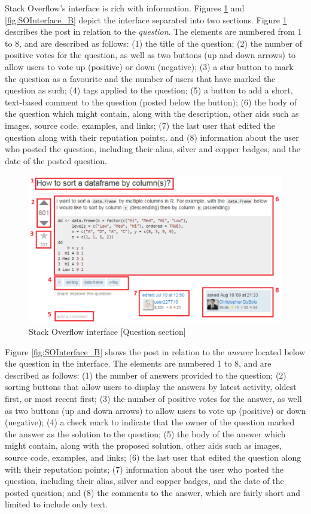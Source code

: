 \documentclass{sig-alternate-05-2015}
\begin{document}
	Stack Overflow's interface is rich with information. Figures \ref{fig:SOInterface_A} and \ref{fig:SOInterface_B} depict the interface separated into two sections. Figure \ref{fig:SOInterface_A} describes the post in relation to the \textit{question}. 
	The elements are numbered from 1 to 8, and are described as follows:
	(1) the title of the question;
	(2) the number of positive votes for the question, as well as two buttons (up and down arrows) to allow users to vote up (positive) or down (negative);
	(3) a star button to mark the question as a favourite and the number of users that have marked the question as such;
	(4) tags applied to the question;
	(5) a button to add a short, text-based comment to the question (posted below the button);
	(6) the body of the question which might contain, along with the description, other aids such as images, source code, examples, and links;
	(7) the last user that edited the question along with their reputation points;.
	and (8) information about the user who posted the question, including their alias, silver and copper badges, and the date of the posted question.

	\begin{figure}[!htb]
	\centering
	\includegraphics[width=\columnwidth]{Figures/SOInterface_A}
	\caption{Stack Overflow interface [Question section]}
	\label{fig:SOInterface_A}
	\end{figure}

	Figure \ref{fig:SOInterface_B} shows the post in relation to the \textit{answer} located below the question in the interface.
	The elements are numbered 1 to 8, and are described as follows:
	(1) the number of answers provided to the question;
	(2) sorting buttons that allow users to display the answers by latest activity, oldest first, or most recent first;
	(3) the number of positive votes for the answer, as well as two buttons (up and down arrows) to allow users to vote up (positive) or down (negative);
	(4) a check mark to indicate that the owner of the question marked the answer as the solution to the question;
	(5) the body of the answer which might contain, along with the proposed solution, other aids such as images, source code, examples, and links;
	(6)	the last user that edited the question along with their reputation points;
	(7) information about the user who posted the question, including their alias, silver and copper badges, and the date of the posted question;
	and (8) the comments to the answer, which are fairly short and limited to include only text.
\end{document}
